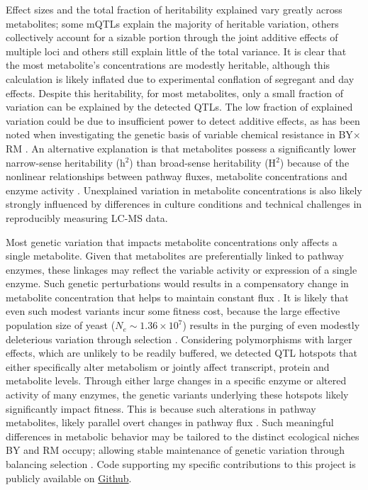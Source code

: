 Effect sizes and the total fraction of heritability explained vary greatly across metabolites; some mQTLs explain the majority of heritable variation, others collectively account for a sizable portion through the joint additive effects of multiple loci and others still explain little of the total variance.  It is clear that the most metabolite's concentrations are modestly heritable, although this calculation is likely inflated due to experimental conflation of segregant and day effects.  Despite this heritability, for most metabolites, only a small fraction of variation can be explained by the detected QTLs.  The low fraction of explained variation could be due to insufficient power to detect additive effects, as has been noted when investigating the genetic basis of variable chemical resistance in BY$\times$RM \cite{Bloom:2013bq}.  An alternative explanation is that metabolites possess a significantly lower narrow-sense heritability (h$^{2}$) than broad-sense heritability (H$^{2}$) because of the nonlinear relationships between pathway fluxes, metabolite concentrations and enzyme activity \cite{Kacser:1973fe, Rowe:2008ty}. Unexplained variation in metabolite concentrations is also likely strongly influenced by differences in culture conditions and technical challenges in reproducibly measuring LC-MS data. 

Most genetic variation that impacts metabolite concentrations only affects a single metabolite.  Given that metabolites are preferentially linked to pathway enzymes, these linkages may reflect the variable activity or expression of a single enzyme. Such genetic perturbations would results in a compensatory change in metabolite concentration that helps to maintain constant flux \cite{Fendt:2010gr}. It is likely that even such modest variants incur some fitness cost, because the large effective population size of yeast ($N_{e} \sim 1.36 \times 10^{7}$) results in the purging of even modestly deleterious variation through selection \cite{Hartl:2007fy,Ohta:1973ub,Wagner:2005cn}. Considering polymorphisms with larger effects, which are unlikely to be readily buffered, we detected QTL hotspots that either specifically alter metabolism or jointly affect transcript, protein and metabolite levels.  Through either large changes in a specific enzyme or altered activity of many enzymes, the genetic variants underlying these hotspots likely significantly impact fitness. This is because such alterations in pathway metabolites, likely parallel overt changes in pathway flux \cite{Dykhuizen:1987uq}. Such meaningful differences in metabolic behavior may be tailored to the distinct ecological niches BY and RM occupy; allowing stable maintenance of genetic variation through balancing selection \cite{Hartl:2007fy}. Code supporting my specific contributions to this project is publicly available on \href{https://github.com/shackett/mQTL}{Github}.

